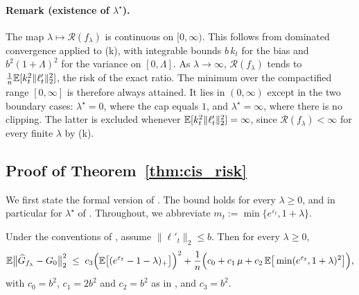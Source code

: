 \paragraph{Remark (existence of $\lambda^\star$).}
The map $\lambda\mapsto\mathcal R(f_\lambda)$ is continuous on $[0,\infty)$.
This follows from dominated convergence applied to (k), with integrable
bounds $b\,k_t$ for the bias and $b^2(1+\Lambda)^2$ for the variance on
$[0,\Lambda]$. As $\lambda\to\infty$, $\mathcal R(f_\lambda)$ tends to
$\frac1n\mathbb{E}[k_t^2\|\ell'_t\|_2^2]$, the risk of the exact ratio. The minimum
over the compactified range $[0,\infty]$ is therefore always attained. It
lies in $(0,\infty)$ except in the two boundary cases: $\lambda^\star=0$,
where the cap equals $1$, and $\lambda^\star=\infty$, where there is no
clipping. The latter is excluded whenever $\mathbb{E}[k_t^2\|\ell'_t\|_2^2]=\infty$,
since $\mathcal R(f_\lambda)<\infty$ for every finite $\lambda$ by (k).

\subsection{Proof of Theorem~\ref{thm:cis_risk}}
\label{app:proof_cis_risk}

We first state the formal version of . The bound holds for
every $\lambda\ge0$, and in particular for $\lambda^\star$ of
. Throughout, we abbreviate
$m_t:=\min\{e^{\varepsilon_t},1+\lambda\}$.

\begin{theorem}
\label{thm:cis_risk_formal}
Under the conventions of , assume $\|\ell'_t\|_2\le b$. Then
for every $\lambda\ge0$,
\begin{equation}
\mathbb{E}\big\|\widehat G_{f_\lambda}-G_0\big\|_2^2
\;\le\;
c_3\Big(\mathbb{E}\big[(e^{\varepsilon_t}-1-\lambda)_+\big]\Big)^2
+\frac1n\Big(c_0+c_1\,\mu+c_2\,\mathbb{E}\big[\min(e^{\varepsilon_t},1+\lambda)^2\big]\Big),
\label{eq:cis_risk_formal}
\end{equation}
with $c_0=b^2$, $c_1=2b^2$ and $c_2=b^2$ as in ,
and $c_3=b^2$.
\end{theorem}

